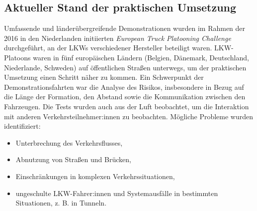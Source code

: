 \documentclass[
]{book}
\providecommand{\tightlist}{%
  \setlength{\itemsep}{0pt}\setlength{\parskip}{0pt}}
\begin{document}
\hypertarget{aktueller-stand-der-praktischen-umsetzung-10}{%
\subsection*{Aktueller Stand der praktischen Umsetzung}\label{aktueller-stand-der-praktischen-umsetzung-10}}

Umfassende und länderübergreifende Demonstrationen wurden im Rahmen der 2016 in den Niederlanden initiierten \emph{European Truck Platooning Challenge} durchgeführt, an der LKWs verschiedener Hersteller beteiligt waren. LKW-Platoons waren in fünf europäischen Ländern (Belgien, Dänemark, Deutschland, Niederlande, Schweden) auf öffentlichen Straßen unterwegs, um der praktischen Umsetzung einen Schritt näher zu kommen. Ein Schwerpunkt der Demonstrationsfahrten war die Analyse des Risikos, insbesondere in Bezug auf die Länge der Formation, den Abstand sowie die Kommunikation zwischen den Fahrzeugen. Die Tests wurden auch aus der Luft beobachtet, um die Interaktion mit anderen Verkehrsteilnehmer:innen zu beobachten. Mögliche Probleme wurden identifiziert:

\begin{itemize}
\tightlist
\item
  Unterbrechung des Verkehrsflusses,
\item
  Abnutzung von Straßen und Brücken,
\item
  Einschränkungen in komplexen Verkehrssituationen,
\item
  ungeschulte LKW-Fahrer:innen und Systemausfälle in bestimmten Situationen, z. B. in Tunneln.
\end{itemize}
\end{document}

